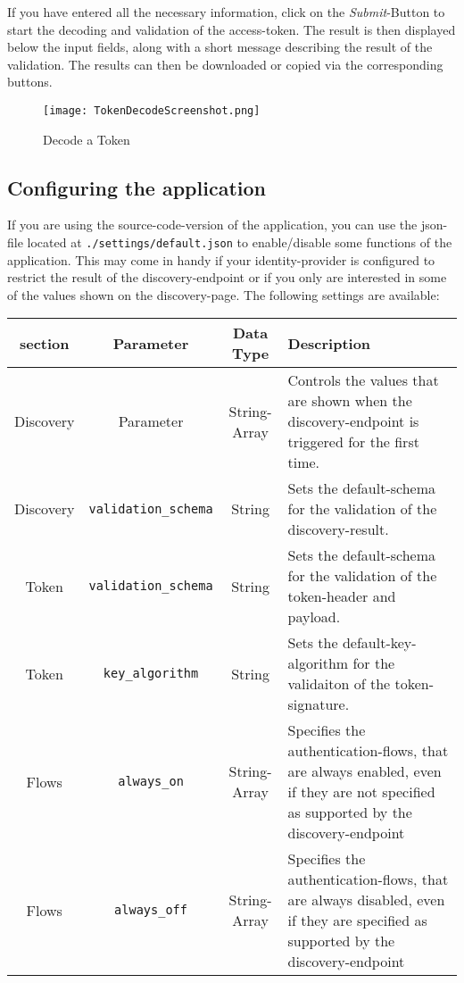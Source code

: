 \documentclass[english, letterpaper, 10 pt]{report}
\begin{document}
\noindent If you have entered all the necessary information, click on the \textit{Submit}-Button to start the decoding and validation of the access-token. The result is then displayed below the input fields, along with a short message describing the result of the validation. The results can then be downloaded or copied via the corresponding buttons.
\\
\begin{figure}[H]
\texttt{[image: TokenDecodeScreenshot.png]}
\caption{Decode a Token}
\end{figure}
\newpage

\subsection*{Configuring the application}

\noindent If you are using the source-code-version of the application, you can use the json-file located at \texttt{./settings/default.json} to enable/disable some functions of the application. This may come in handy if your identity-provider is configured to restrict the result of the discovery-endpoint or if you only are interested in some of the values shown on the discovery-page. The following settings are available:

\begin{table}[h!]
  \begin{center}
    \begin{tabular}{|c|c|c|p{6cm}|} %
    \hline
      \textbf{section} & \textbf{Parameter} & \textbf{Data Type} & \textbf{Description}\\
      \hline
      Discovery & Parameter & String-Array & Controls the values that are shown when the discovery-endpoint is triggered for the first time.\\ \hline
      Discovery & \verb|validation_schema| & String & Sets the default-schema for the validation of the discovery-result.\\ \hline
      Token & \verb|validation_schema| & String & Sets the default-schema for the validation of the token-header and payload.\\ \hline
      Token & \verb|key_algorithm| & String & Sets the default-key-algorithm for the validaiton of the token-signature.\\ \hline
      Flows & \verb|always_on| & String-Array & Specifies the authentication-flows, that are always enabled, even if they are not specified as supported by the discovery-endpoint\\ \hline
      Flows & \verb|always_off| & String-Array & Specifies the authentication-flows, that are always disabled, even if they are specified as supported by the discovery-endpoint\\ \hline
    \end{tabular}
  \end{center}
\end{table}
\end{document}
